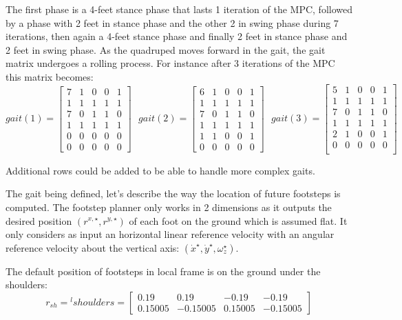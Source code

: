 \documentclass[a4paper,11pt]{article}
\begin{document}
The first phase is a 4-feet stance phase that lasts 1 iteration of the MPC, followed by a phase with 2 feet in stance phase and the other 2 in swing phase during 7 iterations, then again a 4-feet stance phase and finally 2 feet in stance phase and 2 feet in swing phase. As the quadruped moves forward in the gait, the gait matrix undergoes a rolling process. For instance after 3 iterations of the MPC this matrix becomes:
\begin{equation}
gait(1) = \begin{bmatrix} 
7 & 1 & 0 & 0 & 1 \\
1 & 1 & 1 & 1 & 1 \\
7 & 0 & 1 & 1 & 0 \\
1 & 1 & 1 & 1 & 1 \\
0 & 0 & 0 & 0 & 0 \\
0 & 0 & 0 & 0 & 0 \end{bmatrix} 
\text{ }
gait(2) = \begin{bmatrix} 
6 & 1 & 0 & 0 & 1 \\
1 & 1 & 1 & 1 & 1 \\
7 & 0 & 1 & 1 & 0 \\
1 & 1 & 1 & 1 & 1 \\
1 & 1 & 0 & 0 & 1 \\
0 & 0 & 0 & 0 & 0 \end{bmatrix} 
\text{ }
gait(3) = \begin{bmatrix} 
5 & 1 & 0 & 0 & 1 \\
1 & 1 & 1 & 1 & 1 \\
7 & 0 & 1 & 1 & 0 \\
1 & 1 & 1 & 1 & 1 \\
2 & 1 & 0 & 0 & 1 \\
0 & 0 & 0 & 0 & 0 \\\end{bmatrix} \label{eq:gait123}
\end{equation}

Additional rows could be added to be able to handle more complex gaits.

The gait being defined, let's describe the way the location of future footsteps is computed. The footstep planner only works in 2 dimensions as it outputs the desired position $(r^{x, \star}, r^{y,\star})$ of each foot on the ground which is assumed flat. It only considers as input an horizontal linear reference velocity with an angular reference velocity about the vertical axis: $(\dot x^\star, \dot y^\star, \omega_{z}^\star)$.

The default position of footsteps in local frame is on the ground under the shoulders:
\begin{equation}
{r}_{sh} = {}^l\!shoulders = \begin{bmatrix} 0.19 & 0.19 & -0.19 & -0.19 \\ 0.15005 & -0.15005 & 0.15005 & -0.15005 \end{bmatrix}
\end{equation}
\end{document}
